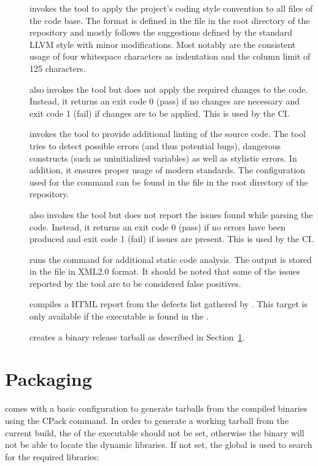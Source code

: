 \begin{description}
  \item[] invokes the  tool to apply the project's coding style convention to all files of the code base. The format is defined in the  file in the root directory of the repository and mostly follows the suggestions defined by the standard LLVM style with minor modifications. Most notably are the consistent usage of four whitespace characters as indentation and the column limit of 125 characters.
  \item[] also invokes the  tool but does not apply the required changes to the code. Instead, it returns an exit code 0 (pass) if no changes are necessary and exit code 1 (fail) if changes are to be applied. This is used by the CI.
  \item[] invokes the  tool to provide additional linting of the source code. The tool tries to detect possible errors (and thus potential bugs), dangerous constructs (such as uninitialized variables) as well as stylistic errors. In addition, it ensures proper usage of modern \CPP standards. The configuration used for the  command can be found in the  file in the root directory of the repository.
  \item[] also invokes the  tool but does not report the issues found while parsing the code. Instead, it returns an exit code 0 (pass) if no errors have been produced and exit code 1 (fail) if issues are present. This is used by the CI.
  \item[] runs the  command for additional static code analysis. The output is stored in the file  in XML2.0 format. It should be noted that some of the issues reported by the tool are to be considered false positives.
  \item[] compiles a HTML report from the defects list gathered by . This target is only available if the  executable is found in the .
  \item[] creates a binary release tarball as described in Section~\ref{sec:packaging}.
\end{description}

\section{Packaging}
\label{sec:packaging}
\apsq comes with a basic configuration to generate tarballs from the compiled binaries using the CPack command. In order to generate a working tarball from the current \apsq build, the  of the executable should not be set, otherwise the  binary will not be able to locate the dynamic libraries. If not set, the global  is used to search for the required libraries:

